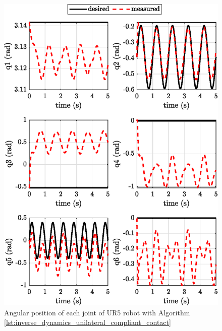 \begin{figure}[H]
    \centering
    \includegraphics{images/act_2.7_z/joint_position.eps}
    \caption{Angular position of each joint of UR5 robot with Algorithm \ref{lst:inverse_dynamics_unilateral_compliant_contact}}
    \label{fig:act_2.7_joint_position}
\end{figure}

